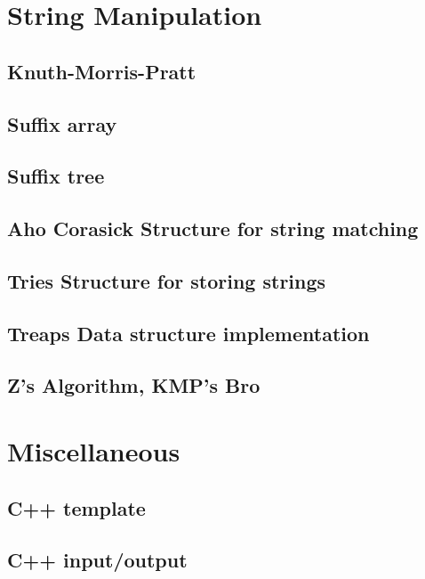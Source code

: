 \section{String Manipulation}
\subsection{Knuth-Morris-Pratt}
\raggedbottom
\hrulefill
\subsection{Suffix array}
\raggedbottom
\hrulefill
\subsection{Suffix tree}
\raggedbottom
\hrulefill
\subsection{Aho Corasick Structure for string matching}
\raggedbottom
\hrulefill
\subsection{Tries Structure for storing strings}
\raggedbottom
\hrulefill
\subsection{Treaps Data structure implementation}
\raggedbottom
\hrulefill
\subsection{Z's Algorithm, KMP's Bro}
\raggedbottom
\hrulefill

\section{Miscellaneous}
\subsection{C++ template}
\raggedbottom
\hrulefill
\subsection{C++ input/output}
\raggedbottom
\hrulefill

